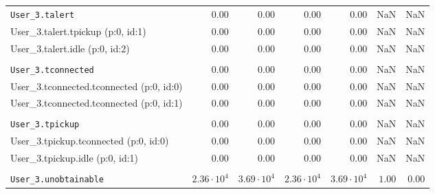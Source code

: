 \begin{table}[htbp]
{\begin{tabular}{lrrrrrr}
\\[-8pt]\texttt{User\_3.talert}                       &              $0.00$ &              $0.00$ &              $0.00$ &              $0.00$ &                  NaN &                  NaN \\
\hspace{3mm}User\_3.talert.tpickup (p:0, id:1)        &              $0.00$ &              $0.00$ &              $0.00$ &              $0.00$ &                  NaN &                  NaN \\
\hspace{3mm}User\_3.talert.idle (p:0, id:2)           &              $0.00$ &              $0.00$ &              $0.00$ &              $0.00$ &                  NaN &                  NaN \\
\\[-8pt]\texttt{User\_3.tconnected}                   &              $0.00$ &              $0.00$ &              $0.00$ &              $0.00$ &                  NaN &                  NaN \\
\hspace{3mm}User\_3.tconnected.tconnected (p:0, id:0) &              $0.00$ &              $0.00$ &              $0.00$ &              $0.00$ &                  NaN &                  NaN \\
\hspace{3mm}User\_3.tconnected.tconnected (p:0, id:1) &              $0.00$ &              $0.00$ &              $0.00$ &              $0.00$ &                  NaN &                  NaN \\
\\[-8pt]\texttt{User\_3.tpickup}                      &              $0.00$ &              $0.00$ &              $0.00$ &              $0.00$ &                  NaN &                  NaN \\
\hspace{3mm}User\_3.tpickup.tconnected (p:0, id:0)    &              $0.00$ &              $0.00$ &              $0.00$ &              $0.00$ &                  NaN &                  NaN \\
\hspace{3mm}User\_3.tpickup.idle (p:0, id:1)          &              $0.00$ &              $0.00$ &              $0.00$ &              $0.00$ &                  NaN &                  NaN \\
\\[-8pt]\texttt{User\_3.unobtainable}                 & $2.36 \cdot 10^{4}$ & $3.69 \cdot 10^{4}$ & $2.36 \cdot 10^{4}$ & $3.69 \cdot 10^{4}$ &               $1.00$ &               $0.00$ \\

\end{tabular}}
\end{table}
